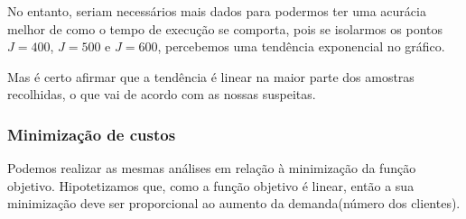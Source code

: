 \documentclass{article}
\begin{document}
No entanto, seriam necessários mais dados para podermos ter uma acurácia melhor de como o tempo de execução se comporta, pois se isolarmos os pontos $J=400$, $J=500$ e $J=600$, percebemos uma tendência exponencial no gráfico.

Mas é certo afirmar que a tendência é linear na maior parte dos amostras recolhidas, o que vai de acordo com as nossas suspeitas.

\subsubsection{Minimização de custos}

Podemos realizar as mesmas análises em relação à minimização da função objetivo. Hipotetizamos que, como a função objetivo é linear, então a sua minimização deve ser proporcional ao aumento da demanda(número dos clientes).
\end{document}
